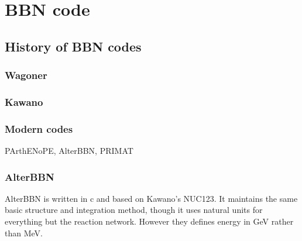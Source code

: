 
\chapter{BBN code}
\label{chap:BBNcode}

\section{History of BBN codes}
\label{sec:BBN_history}

\subsection{Wagoner}
\label{sec:Wagoner}

\subsection{Kawano}
\label{sec:Kawano}

\subsection{Modern codes}
\label{sec:Modern_codes}
PArthENoPE, AlterBBN, PRIMAT


\subsection{AlterBBN}
\label{sec:AlterBBN}

AlterBBN is written in c and based on Kawano's NUC123. It maintains the same basic structure and integration method, though it uses natural units for everything but the reaction network. However they defines energy in GeV rather than MeV. 